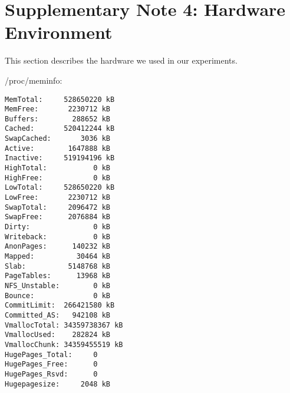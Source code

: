 \documentclass[10pt]{article}
\begin{document}




\section*{Supplementary Note 4: Hardware Environment}

This section describes the hardware we used in our experiments.

\noindent /proc/meminfo:
\begin{verbatim}
MemTotal:     528650220 kB
MemFree:       2230712 kB
Buffers:        288652 kB
Cached:       520412244 kB
SwapCached:       3036 kB
Active:        1647888 kB
Inactive:     519194196 kB
HighTotal:           0 kB
HighFree:            0 kB
LowTotal:     528650220 kB
LowFree:       2230712 kB
SwapTotal:     2096472 kB
SwapFree:      2076884 kB
Dirty:               0 kB
Writeback:           0 kB
AnonPages:      140232 kB
Mapped:          30464 kB
Slab:          5148768 kB
PageTables:      13968 kB
NFS_Unstable:        0 kB
Bounce:              0 kB
CommitLimit:  266421580 kB
Committed_AS:   942108 kB
VmallocTotal: 34359738367 kB
VmallocUsed:    282824 kB
VmallocChunk: 34359455519 kB
HugePages_Total:     0
HugePages_Free:      0
HugePages_Rsvd:      0
Hugepagesize:     2048 kB
\end{verbatim}
\end{document}
